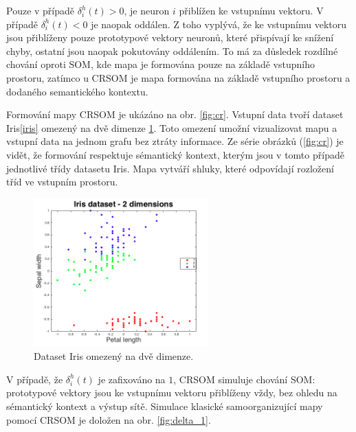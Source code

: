\documentclass[thesis=M,czech]{FITthesis}[2012/06/26]
\begin{document}
Pouze v případě $ \delta_i^h(t) > 0 $, je neuron $i$ přiblížen ke vstupnímu vektoru. V případě $ \delta_i^h(t) < 0 $ je naopak oddálen. Z toho vyplývá, že ke vstupnímu vektoru jsou přiblíženy pouze prototypové vektory neuronů, které přispívají ke snížení chyby, ostatní jsou naopak pokutovány oddálením. To má za důsledek rozdílné chování oproti SOM, kde mapa je formována pouze na základě vstupního prostoru, zatímco u CRSOM je mapa formována na základě vstupního prostoru a dodaného semantického kontextu. 

Formování mapy CRSOM je ukázáno na obr. \ref{fig:cr}. Vstupní data tvoří dataset Iris\ref{iris} omezený na dvě dimenze \ref{fig:iris2d}. Toto omezení umožní vizualizovat mapu a vstupní data na jednom grafu bez ztráty informace. Ze série obrázků (\ref{fig:cr}) je vidět, že formování respektuje sémantický kontext, kterým jsou v tomto případě jednotlivé třídy datasetu Iris. Mapa vytváří shluky, které odpovídají rozložení tříd ve vstupním prostoru.




\begin{figure}[htp]    
    \centering
    \includegraphics[width=0.6\textwidth]{feature_space_with_classes.png}
    \caption{Dataset Iris omezený na dvě dimenze.}
    \label{fig:iris2d}
\end{figure}


V případě, že $ \delta_i^h(t)$ je zafixováno na $1$, CRSOM simuluje chování SOM: prototypové vektory jsou ke vstupnímu vektoru přiblíženy vždy, bez ohledu na sémantický kontext a výstup sítě. Simulace klasické samoorganizující mapy pomocí CRSOM je doložen na obr. \ref{fig:delta_1}.
\end{document}
